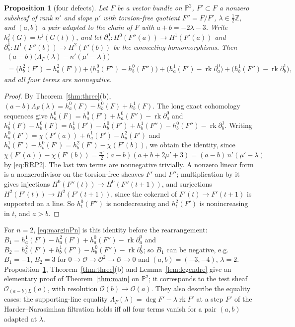 \documentclass[11pt]{amsart}
\newtheorem{proposition}[theorem]{Proposition}
\theoremstyle{definition}
\theoremstyle{remark}
\newcommand{\PP}{\mathbb{P}}
\newcommand{\ZZ}{\mathbb{Z}}
\newcommand{\OO}{\mathcal{O}}
\DeclareMathOperator{\rk}{rk}
\begin{document}
\begin{proposition}[four defects]\label{prop:fourdefect}
Let $F$ be a vector bundle on $\PP^2$, $F'\subset F$ a nonzero subsheaf of rank $n'$ and slope $\mu'$ with torsion-free quotient $F''=F/F'$, $\lambda\in\frac12\ZZ$, and $(a,b)$ a pair adapted to the chain of $F$ with $a+b=-2\lambda-3$. Write $h^j_t(G)=h^j(G(t))$, and let $\partial^0_a\colon H^0(F''(a))\to H^1(F'(a))$ and $\partial^1_b\colon H^1(F''(b))\to H^2(F'(b))$ be the connecting homomorphisms. Then
\begin{multline*}
(a-b)\big(\Lambda_F(\lambda)-n'(\mu'-\lambda)\big)\\=\big(h^2_b(F')-h^2_a(F')\big)+\big(h^0_a(F'')-h^0_b(F'')\big)+\big(h^1_a(F')-\rk\partial^0_a\big)+\big(h^1_b(F'')-\rk\partial^1_b\big),
\end{multline*}
and all four terms are nonnegative.
\end{proposition}

\begin{proof}
By Theorem~\ref{thm:three}(b), $(a-b)\Lambda_F(\lambda)=h^0_a(F)-h^0_b(F)+h^1_b(F)$. The long exact cohomology sequences give $h^0_a(F)=h^0_a(F')+h^0_a(F'')-\rk\partial^0_a$ and $h^1_b(F)-h^0_b(F)=h^1_b(F')-h^0_b(F')+h^1_b(F'')-h^0_b(F'')-\rk\partial^1_b$. Writing $h^0_a(F')=\chi(F'(a))+h^1_a(F')-h^2_a(F')$ and $h^1_b(F')-h^0_b(F')=h^2_b(F')-\chi(F'(b))$, we obtain the identity, since $\chi(F'(a))-\chi(F'(b))=\frac{n'}2(a-b)(a+b+2\mu'+3)=(a-b)\,n'(\mu'-\lambda)$ by \eqref{eq:RRP2}. The last two terms are nonnegative trivially. A nonzero linear form is a nonzerodivisor on the torsion-free sheaves $F'$ and $F''$; multiplication by it gives injections $H^0(F''(t))\to H^0(F''(t+1))$, and surjections $H^2(F'(t))\to H^2(F'(t+1))$, since the cokernel of $F'(t)\to F'(t+1)$ is supported on a line. So $h^0_t(F'')$ is nondecreasing and $h^2_t(F')$ is nonincreasing in $t$, and $a>b$.
\end{proof}

For $n=2$, \eqref{eq:marginPn} is this identity before the rearrangement: $B_1=h^1_a(F')-h^2_a(F')+h^0_a(F'')-\rk\partial^0_a$ and $B_2=h^2_b(F')+h^1_b(F'')-h^0_b(F'')-\rk\partial^1_b$; so $B_1$ can be negative, e.g.\ $B_1=-1$, $B_2=3$ for $0\to\OO\to\OO^2\to\OO\to0$ and $(a,b)=(-3,-4)$, $\lambda=2$. Proposition~\ref{prop:fourdefect}, Theorem~\ref{thm:three}(b) and Lemma~\ref{lem:legendre} give an elementary proof of Theorem~\ref{thm:main} on $\PP^2$; it corresponds to the test sheaf $\OO_{(a-b)L}(a)$, with resolution $\OO(b)\to\OO(a)$. They also describe the equality cases: the supporting-line equality $\Lambda_F(\lambda)=\deg F'-\lambda\rk F'$ at a step $F'$ of the Harder--Narasimhan filtration holds iff all four terms vanish for a pair $(a,b)$ adapted at $\lambda$.
\end{document}
